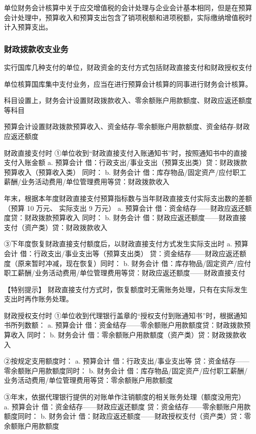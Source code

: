 \documentclass[UTF8,12pt]{ctexart}
\numberwithin{equation}{section} %
\numberwithin{figure}{section}
\numberwithin{table}{section}
\begin{document}
	单位财务会计核算中关于应交增值税的会计处理与企业会计基本相同，但是在预算会计处理中，预算收入和预算支出包含了销项税额和进项税额，实际缴纳增值税时计入预算支出。
	
	\subsubsection{财政拨款收支业务}
	实行国库几种支付的单位，财政资金的支付方式包括财政直接支付和财政授权支付
	
	单位核算国库集中支付业务，应当在进行预算会计核算的同事进行财务会计核算。
	
	科目设置上，财务会计设置财政拨款收入、零余额账户用款额度、财政应返还额度等科目
	
	预算会计设置财政拨款预算收入、资金结存-零余额账户用款额度、资金结存-财政应返还额度
	
	财政直接支付时
	①单位收到“财政直接支付入账通知书”时，按照通知书中的直接支付入账金额
	a.	预算会计
	借：行政支出/事业支出（预算支出类）贷：财政拨款预算收入（预算收入类）
	同时：
	b.	财务会计
	借：库存物品/固定资产/应付职工薪酬/业务活动费用/单位管理费用等贷：财政拨款收入
	
	年末，根据本年度财政直接支付预算指标数与当年财政直接支付实际支出数的差额（预算 10 万元、
	实际支出 9 万元）
	a.	预算会计
	借：资金结存——财政应返还额度贷：财政拨款预算收入
	同时：
	b.	财务会计
	借：财政应返还额度——财政直接支付（资产类）贷：财政拨款收入
	
	③下年度恢复财政直接支付额度后，以财政直接支付方式发生实际支出时
	a.	预算会计
	借：行政支出/事业支出等（预算支出类）
	贷：资金结存——财政应返还额度（原来暂时冲减，现在恢复）同时：
	b.	财务会计
	借：库存物品/固定资产/应付职工薪酬/业务活动费用/单位管理费用等贷：财政应返还额度——财政直接支付
	
	【特别提示】
	财政直接支付方式时，恢复额度时无需账务处理，只有在实际发生支出时再作账务处理。
	
	财政授权支付时
	①单位收到代理银行盖章的“授权支付到账通知书”时，根据通知书所列数额：
	a.	预算会计
	借：资金结存——零余额账户用款额度贷：财政拨款预算收入
	同时：
	b.	财务会计
	借：零余额账户用款额度（资产类）贷：财政拨款收入
	
	②按规定支用额度时：
	a.	预算会计
	借：行政支出/事业支出等
	贷：资金结存——零余额账户用款额度同时：
	b.	财务会计
	借：库存物品/固定资产/应付职工薪酬/业务活动费用/单位管理费用等贷：零余额账户用款额度
	
	③年末，依据代理银行提供的对账单作注销额度的相关账务处理（额度没用完）
	a.	预算会计
	借：资金结存——财政应返还额度
	贷：资金结存——零余额账户用款额度同时：
	b.	财务会计
	借：财政应返还额度——财政授权支付（资产类）贷：零余额账户用款额度
	
\end{document}

